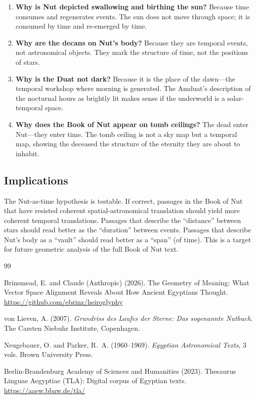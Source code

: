 \documentclass[11pt, a4paper]{article}
\begin{document}
\begin{enumerate}
    \item \textbf{Why is Nut depicted swallowing and birthing the sun?} Because time consumes and regenerates events. The sun does not move through space; it is consumed by time and re-emerged by time.

    \item \textbf{Why are the decans on Nut's body?} Because they are temporal events, not astronomical objects. They mark the structure of time, not the positions of stars.

    \item \textbf{Why is the Duat not dark?} Because it is the place of the dawn---the temporal workshop where morning is generated. The Amduat's description of the nocturnal hours as brightly lit makes sense if the underworld is a solar-temporal space.

    \item \textbf{Why does the Book of Nut appear on tomb ceilings?} The dead enter Nut---they enter time. The tomb ceiling is not a sky map but a temporal map, showing the deceased the structure of the eternity they are about to inhabit.
\end{enumerate}

\subsection{Implications}

The Nut-as-time hypothesis is testable. If correct, passages in the Book of Nut that have resisted coherent spatial-astronomical translation should yield more coherent temporal translations. Passages that describe the ``distance'' between stars should read better as the ``duration'' between events. Passages that describe Nut's body as a ``vault'' should read better as a ``span'' (of time). This is a target for future geometric analysis of the full Book of Nut text.


\begin{thebibliography}{99}

Brinsmead, E. and Claude (Anthropic) (2026).
\newblock The Geometry of Meaning: What Vector Space Alignment Reveals About How Ancient Egyptians Thought.
\newblock \url{https://github.com/ebrinz/heiroglyphy}

von Lieven, A. (2007).
\newblock \textit{Grundriss des Laufes der Sterne: Das sogenannte Nutbuch}.
\newblock The Carsten Niebuhr Institute, Copenhagen.

Neugebauer, O. and Parker, R.~A. (1960--1969).
\newblock \textit{Egyptian Astronomical Texts}, 3 vols.
\newblock Brown University Press.

Berlin-Brandenburg Academy of Sciences and Humanities (2023).
\newblock Thesaurus Linguae Aegyptiae (TLA): Digital corpus of Egyptian texts.
\newblock \url{https://aaew.bbaw.de/tla/}

\end{thebibliography}
\end{document}
